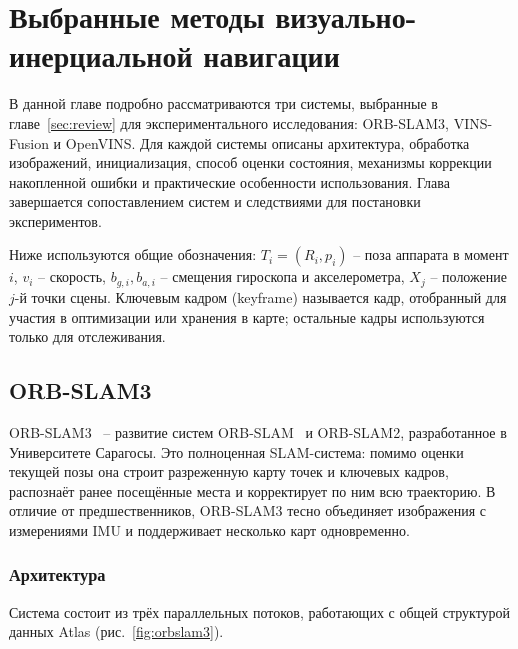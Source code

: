     \section{Выбранные методы визуально-инерциальной навигации}\label{sec:methods}


    В данной главе подробно рассматриваются три системы, выбранные в главе~\ref{sec:review} для экспериментального исследования: ORB-SLAM3, VINS-Fusion и OpenVINS.
    Для каждой системы описаны архитектура, обработка изображений, инициализация, способ оценки состояния, механизмы коррекции накопленной ошибки и практические особенности использования.
    Глава завершается сопоставлением систем и следствиями для постановки экспериментов.

    Ниже используются общие обозначения: $T_i = (R_i, p_i)$ -- поза аппарата в момент $i$, $v_i$ -- скорость, $b_{g,i}, b_{a,i}$ -- смещения гироскопа и акселерометра, $X_j$ -- положение $j$-й точки сцены.
    Ключевым кадром (keyframe) называется кадр, отобранный для участия в оптимизации или хранения в карте; остальные кадры используются только для отслеживания.

    \subsection{ORB-SLAM3}

    ORB-SLAM3~\cite{orbslam3} -- развитие систем ORB-SLAM~\cite{orbslam} и ORB-SLAM2, разработанное в Университете Сарагосы.
    Это полноценная SLAM-система: помимо оценки текущей позы она строит разреженную карту точек и ключевых кадров, распознаёт ранее посещённые места и корректирует по ним всю траекторию.
    В отличие от предшественников, ORB-SLAM3 тесно объединяет изображения с измерениями IMU и поддерживает несколько карт одновременно.

    \subsubsection{Архитектура}
    Система состоит из трёх параллельных потоков, работающих с общей структурой данных Atlas (рис.~\ref{fig:orbslam3}).

